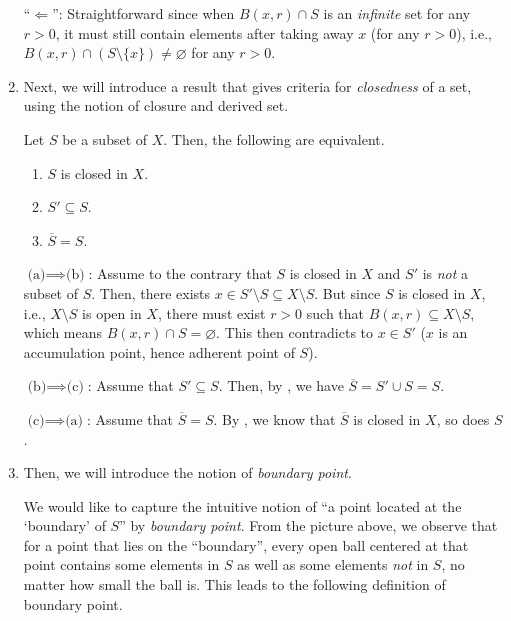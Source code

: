 \begin{enumerate}
\begin{pf}
``\(\Leftarrow\)'': Straightforward since when \(B(x,r)\cap S\) is an
\emph{infinite} set for any \(r>0\), it must still contain elements after
taking away \(x\) (for any \(r>0\)), i.e., \(B(x,r)\cap
(S\setminus\{x\})\ne\varnothing\) for any \(r>0\).
\end{pf}

\item Next, we will introduce a result that gives criteria for
\emph{closedness} of a set, using the notion of closure and derived set.

\begin{proposition}
\label{prp:equiv-crit-closed}
Let \(S\) be a subset of \(X\). Then, the following are equivalent.
\begin{enumerate}
\item \(S\) is closed in \(X\).
\item \(S'\subseteq S\).
\item \(\overline{S}=S\).
\end{enumerate}
\end{proposition}
\begin{pf}
\underline{\(\text{(a)}\implies \text{(b)}\)}: Assume to the contrary that
\(S\) is closed in \(X\) and \(S'\) is \emph{not} a subset of \(S\). Then,
there exists \(x\in S'\setminus S\subseteq X\setminus S\). But since \(S\) is
closed in \(X\), i.e., \(X\setminus S\) is open in \(X\), there must exist
\(r>0\) such that \(B(x,r)\subseteq X\setminus S\), which means \(B(x,r)\cap
S=\varnothing\). This then contradicts to \(x\in S'\) (\(x\) is an accumulation
point, hence adherent point of \(S\)).

\underline{\(\text{(b)}\implies \text{(c)}\)}: Assume that \(S'\subseteq S\).
Then, by , we have \(\overline{S}=S'\cup S=S\).

\underline{\(\text{(c)}\implies \text{(a)}\)}: Assume that \(\overline{S}=S\).
By , we know that \(\overline{S}\) is closed
in \(X\), so does \(S\).
\end{pf}

\item Then, we will introduce the notion of \emph{boundary point}.
\begin{center}
\end{center}
We would like to capture the intuitive notion of ``a point located at the
`boundary' of \(S\)'' by \emph{boundary point}. From the picture above, we
observe that for a point that lies on the ``boundary'', every open ball
centered at that point contains some elements in \(S\) as well as some elements
\emph{not} in \(S\), no matter how small the ball is. This leads to the
following definition of boundary point.


\end{enumerate}
